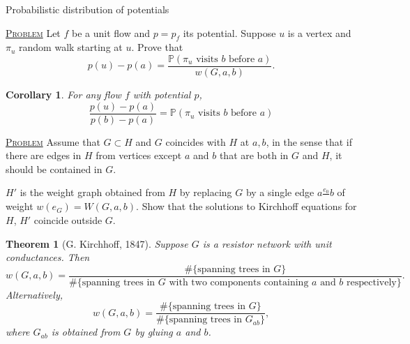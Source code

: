 \documentclass{report}
\newcommand{\matP}{\mathbb{P}}
\newcommand{\fancyem}[1]{\underline{\textsc{#1}}}
\newtheorem{theorem}{Theorem}[section]
\newtheorem{corollary}{Corollary}[section]
\theoremstyle{definition}
\theoremstyle{remark}
\numberwithin{equation}{section}
\begin{document}

Probabilistic distribution of potentials

\fancyem{Problem} Let $f$ be a unit flow and $p = p_f$ its potential. Suppose $u$ is a vertex and $\pi_u$ random walk starting at $u$. Prove that \[p(u) - p(a) = \frac{\matP(\pi_u \text{ visits $b$ before $a$})}{w(G, a, b)}.\]

\begin{corollary}
    For any flow $f$ with potential $p$,
    \[
    \frac{p(u) - p(a)}{p(b) - p(a)} = \matP(\pi_u \text{ visits $b$ before $a$})
    \]
\end{corollary}

\fancyem{Problem} Assume that $G \subset H$ and $G$ coincides with $H$ at $a, b$, in the sense that if there are edges in $H$ from vertices except $a$ and $b$ that are both in $G$ and $H$, it should be contained in $G$.

$H'$ is the weight graph obtained from $H$ by replacing $G$ by a single edge $a \frac{e_0}{} b$ of weight $w(e_G) = W(G, a, b)$. Show that the solutions to Kirchhoff equations for $H$, $H'$ coincide outside $G$.

\begin{theorem}[G. Kirchhoff, 1847]
    Suppose $G$ is a resistor network with unit conductances. Then
    \[
        w(G, a, b) = \frac{\#\{\text{spanning trees in $G$}\}}{\#\{\text{spanning trees in $G$ with two components containing $a$ and $b$ respectively}\}}.
    \]
    Alternatively,
    \[
        w(G, a, b) = \frac{\#\{\text{spanning trees in $G$}\}}{\#\{\text{spanning trees in $G_{ab}$}\}},
    \] where $G_{ab}$ is obtained from $G$ by gluing $a$ and $b$.
\end{theorem}
\end{document}
